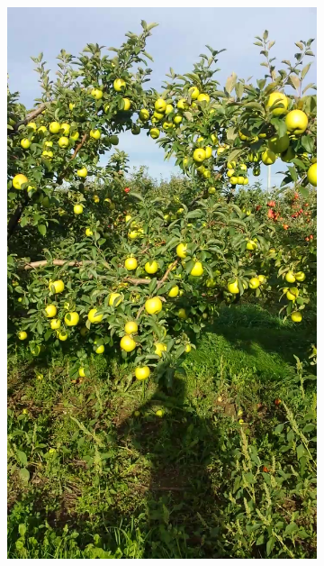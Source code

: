 \begin{figure}[!htb]
    \centering
    \begin{subfigure}[b]{0.18\textwidth}
    \includegraphics[width=\textwidth]{figures/detection/training1.png}%
    \end{subfigure}\hspace{.2cm} \begin{subfigure}[b]{0.18\textwidth}

\end{subfigure}
\end{figure}
